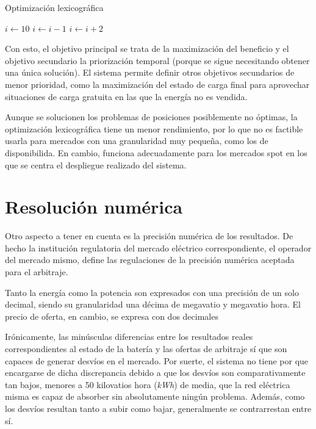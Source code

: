 \begin{algorithm}
  \caption{Optimización lexicográfica}
  \label{alg:optimización-lexicográfica}
  \begin{algorithmic}
    \State $i \gets 10$
    \State $i \gets i-1$
    \Else
    \State $i \gets i+2$
    \EndIf
    \EndIf
  \end{algorithmic}
\end{algorithm}

Con esto, el objetivo principal se trata de la maximización del beneficio y el objetivo secundario la priorización temporal (porque se sigue necesitando obtener una única solución). El sistema permite definir otros objetivos secundarios de menor prioridad, como la maximización del estado de carga final para aprovechar situaciones de carga gratuita en las que la energía no es vendida.

Aunque se solucionen los problemas de posiciones posiblemente no óptimas, la optimización lexicográfica tiene un menor rendimiento, por lo que no es factible usarla para mercados con una granularidad muy pequeña, como los de disponibilida. En cambio, funciona adecuadamente para los mercados spot en los que se centra el despliegue realizado del sistema.

\section{Resolución numérica}
\label{makereference5.5}

Otro aspecto a tener en cuenta es la precisión numérica de los resultados. De hecho la institución regulatoria del mercado eléctrico correspondiente, el operador del mercado mismo, define las regulaciones de la precisión numérica aceptada para el arbitraje.

Tanto la energía como la potencia son expresados con una precisión de un solo decimal, siendo su granularidad una décima de megavatio y megavatio hora. El precio de oferta, en cambio, se expresa con dos decimales

Irónicamente, las minúsculas diferencias entre los resultados reales correspondientes al estado de la batería y las ofertas de arbitraje sí que son capaces de generar desvíos en el mercado. Por suerte, el sistema no tiene por que encargarse de dicha discrepancia debido a que los desvíos son comparativamente tan bajos, menores a 50 kilovatios hora (\textit{kWh}) de media, que la red eléctrica misma es capaz de absorber sin absolutamente ningún problema. Además, como los desvíos resultan tanto a subir como bajar, generalmente se contrarrestan entre sí.

